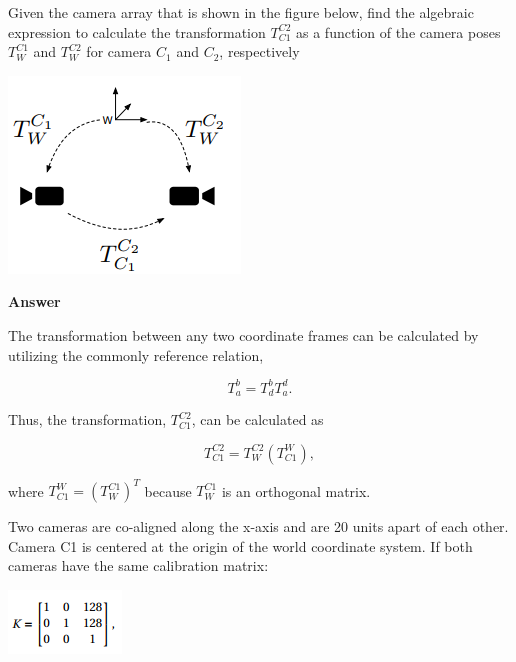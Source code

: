 \documentclass[12pt, letterpaper]{article}
\begin{document}
\vspace{1.5cm}
 \hspace{0.4cm} Given the camera array that is shown in the figure below, find the algebraic expression to calculate the transformation $T^{C2}_{C1}$ as a function of the camera poses $T^{C1}_{W}$ and $T^{C2}_{W}$ for camera $C_{1}$ and $C_{2}$, respectively


\begin{center}
\includegraphics[scale=0.7]{figs/rigid_trans.png}
\end{center}

{\bf{ Answer \\}}

\indent The transformation between any two coordinate frames can be calculated by utilizing the commonly reference relation, 

$$ T_{a}^{b} = T^{b}_{d}T^{d}_{a}. $$

\indent Thus, the transformation, $T^{C2}_{C1}$, can be calculated as 

$$ T^{C2}_{C1} = T^{C2}_{W} ( T^{W}_{C1} ), $$

\indent where $T^{W}_{C1} = (T^{C1}_{W})^{T}$ because $T^{C1}_{W}$ is an orthogonal matrix.



\vspace{1.5cm}
 \hspace{0.4cm} Two cameras are co-aligned along the x-axis and are 20 units
apart of each other. Camera C1 is centered at the origin of the world coordinate system. If both
cameras have the same calibration matrix:

\begin{center}
\includegraphics[scale=0.7]{figs/camera_cal.png}
\end{center}
\end{document}

